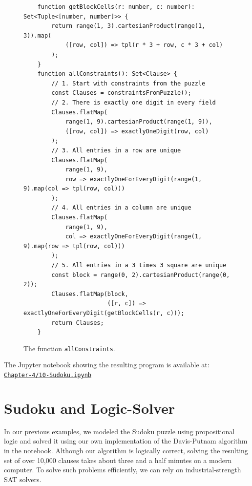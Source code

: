 \begin{figure}[!ht]
\centering
\begin{verbatim}
    function getBlockCells(r: number, c: number): Set<Tuple<[number, number]>> {
        return range(1, 3).cartesianProduct(range(1, 3)).map(
            ([row, col]) => tpl(r * 3 + row, c * 3 + col)
        );
    }
    function allConstraints(): Set<Clause> {
        // 1. Start with constraints from the puzzle
        const Clauses = constraintsFromPuzzle();
        // 2. There is exactly one digit in every field
        Clauses.flatMap(
            range(1, 9).cartesianProduct(range(1, 9)), 
            ([row, col]) => exactlyOneDigit(row, col)
        );
        // 3. All entries in a row are unique
        Clauses.flatMap(
            range(1, 9), 
            row => exactlyOneForEveryDigit(range(1, 9).map(col => tpl(row, col)))
        );
        // 4. All entries in a column are unique
        Clauses.flatMap(
            range(1, 9), 
            col => exactlyOneForEveryDigit(range(1, 9).map(row => tpl(row, col)))
        );
        // 5. All entries in a 3 times 3 square are unique
        const block = range(0, 2).cartesianProduct(range(0, 2));
        Clauses.flatMap(block,
                        ([r, c]) => exactlyOneForEveryDigit(getBlockCells(r, c)));
        return Clauses;
    }  
\end{verbatim}
\vspace*{-0.3cm}
\caption{The function \texttt{allConstraints}.}
\label{fig:sudoku-allConstraints}
\end{figure}
The Jupyter notebook showing the resulting program is available at:
\\[0.2cm]
\hspace*{1.3cm}
\href{https://github.com/karlstroetmann/Logic/blob/master/TypeScript/Chapter-4/10-Sudoku.ipynb}{\texttt{Chapter-4/10-Sudoku.ipynb}}

\FloatBarrier

\section{Sudoku and Logic-Solver}
In our previous examples, we modeled the Sudoku puzzle using propositional logic and solved it using our own
implementation of the Davis-Putnam algorithm in the notebook. Although our algorithm
is logically correct, solving the resulting set of over 10,000 clauses takes about three and a half minutes on
a modern computer. To solve such problems efficiently, we can rely on industrial-strength SAT solvers. 

